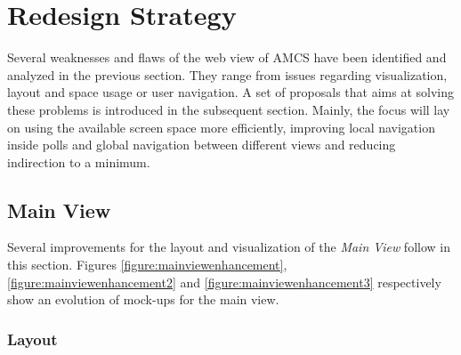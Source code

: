 \section{Redesign Strategy}
\label{section:con:proposals}
Several weaknesses and flaws of the web view of AMCS have been identified and analyzed in the previous section. They range from issues regarding visualization, layout and space usage or user navigation.
A set of proposals that aims at solving these problems is introduced in the subsequent section. Mainly, the focus will lay on using the available screen space more efficiently, improving local navigation inside polls and global navigation between different views and reducing indirection to a minimum.

\subsection{Main View}

Several improvements for the layout and visualization of the \emph{Main View} follow in this section. Figures \ref{figure:mainviewenhancement}, \ref{figure:mainviewenhancement2} and \ref{figure:mainviewenhancement3} respectively show an evolution of mock-ups for the main view.
\subsubsection{Layout}
\label{section:con:proposals:mainview:layout}
